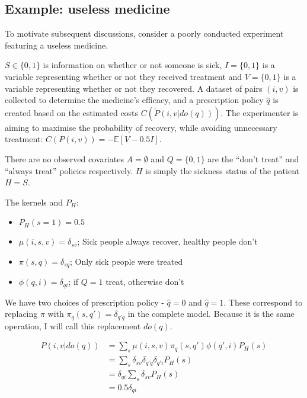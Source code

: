 \subsection{Example: useless medicine}\label{sec:useless_medicine}

To motivate subsequent discussions, consider a poorly conducted experiment featuring a useless medicine. 

$S\in \{0,1\}$ is information on whether or not someone is sick, $I=\{0,1\}$ is a variable representing whether or not they received treatment and $V=\{0,1\}$ is a variable representing whether or not they recovered. A dataset of pairs $(i,v)$ is collected to determine the medicine's efficacy, and a prescription policy $\hat{q}$ is created based on the estimated costs $C(\tilde{P}(i,v|do(q)))$.  The experimenter is aiming to maximise the probability of recovery, while avoiding unnecessary treatment: $C(P(i,v))=-\mathbb{E}[V-0.5I]$. 

There are no observed covariates $A=\emptyset$ and $Q=\{0,1\}$ are the ``don't treat'' and ``always treat'' policies respectively. $H$ is simply the sickness status of the patient $H=S$.

The kernels and $P_H$:
\begin{itemize}
    \item $P_H(s=1) = 0.5$
    \item $\mu(i,s,v) =\delta_{sv}$; Sick people always recover, healthy people don't
    \item $\pi(s,q)=\delta_{sq}$; Only sick people were treated
    \item $\phi(q,i)=\delta_{qi}$; if $Q=1$ treat, otherwise don't
\end{itemize}

We have two choices of prescription policy - $\hat{q}=0$ and $\hat{q}=1$. These correspond to replacing $\pi$ with $\pi_{q}(s,q') = \delta_{q'q}$ in the complete model. Because it is the same operation, I will call this replacement $do(q)$.

\begin{align}
    P(i,v|do(q)) &= \sum_{s} \mu(i,s,v) \pi_{q}(s,q') \phi(q',i) P_H(s) \\
                         &= \sum_{s} \delta_{sv} \delta_{q'q} \delta_{q'i} P_H(s) \\
                         &= \delta_{qi} \sum_{s} \delta_{sv} P_H(s) \\
                         &= 0.5 \delta_{qi}
\end{align}

